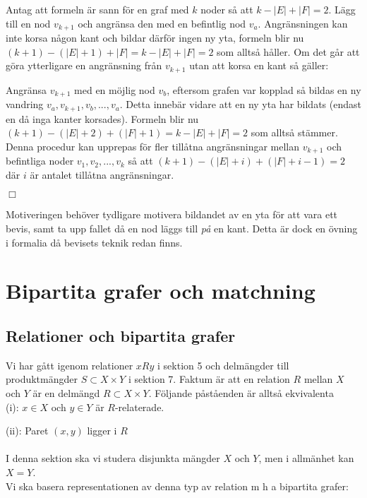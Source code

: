 \documentclass{article}
\begin{document}
Antag att formeln är sann för en graf med $k$ noder så att $k-|E|+|F|=2$. Lägg till en nod $v_{k+1}$ och angränsa den med en befintlig nod $v_a$. Angränsningen kan inte korsa någon kant och bildar därför ingen ny yta, formeln blir nu $(k+1)-(|E|+1)+|F|=k-|E|+|F|=2$ som alltså håller. Om det går att göra ytterligare en angränsning från $v_{k+1}$ utan att korsa en kant så gäller: 

Angränsa $v_{k+1}$ med en möjlig nod $v_b$, eftersom grafen var kopplad så bildas en ny vandring $v_a,v_{k+1},v_b,...,v_a$. Detta innebär vidare att en ny yta har bildats (endast en då inga kanter korsades). Formeln blir nu $(k+1)-(|E|+2)+(|F|+1)=k-|E|+|F|=2$ som alltså stämmer. Denna procedur kan upprepas för fler tillåtna angränsningar mellan $v_{k+1}$ och befintliga noder $v_1,v_2,...,v_k$ så att $(k+1)-(|E|+i)+(|F|+i-1)=2$ där $i$ är antalet tillåtna angränsningar.
\begin{flushright}
$\Box$
\end{flushright}
Motiveringen behöver tydligare motivera bildandet av en yta för att vara ett bevis, samt ta upp fallet då en nod läggs till \textit{på} en kant. Detta är dock en övning i formalia då bevisets teknik redan finns.

\section{Bipartita grafer och matchning}

\subsection{Relationer och bipartita grafer}
Vi har gått igenom relationer $xRy$ i sektion 5 och delmängder till produktmängder $S\subset X\times Y$ i sektion 7. Faktum är att en relation $R$ mellan $X$ och $Y$ är en delmängd $R\subset X\times Y$. Följande påståenden är alltså ekvivalenta\\

(i): $x\in X$ och $y\in Y$ är $R$-relaterade.

(ii): Paret $(x,y)$ ligger i $R$\\ \\ 
I denna sektion ska vi studera disjunkta mängder $X$ och $Y$, men i allmänhet kan $X=Y$.\\
Vi ska basera representationen av denna typ av relation m h a bipartita grafer:
\end{document}

